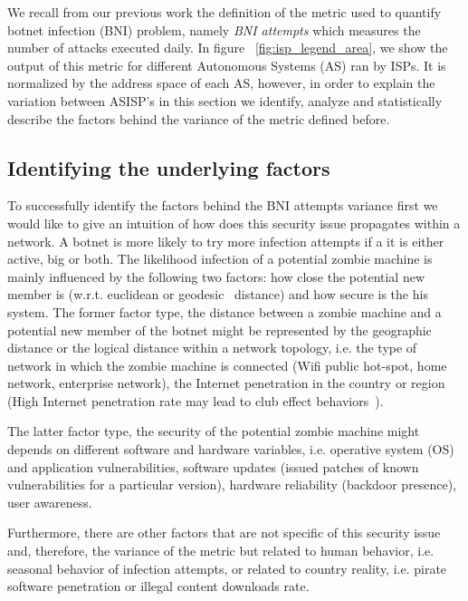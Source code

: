 


We recall from our previous work the definition of the metric used to quantify botnet infection (BNI) problem, namely \textit{BNI attempts} which measures the number of attacks executed daily. In figure ~\ref{fig:isp_legend_area}, we show the output of this metric for different Autonomous Systems (AS) ran by ISPs. It is normalized by the address space of each AS, however, in order to explain the variation between AS\/ISP's in this section we identify, analyze and statistically describe the factors behind the variance of the metric defined before.

\subsection{Identifying the underlying factors}
To successfully identify the factors behind the BNI attempts variance first we would like to give an intuition of how does this security issue propagates within a network. A botnet is more likely to try more infection attempts if a it is either active, big or both. The likelihood infection of a potential zombie machine is mainly influenced by the following two factors: how close the potential new member is (w.r.t. euclidean or geodesic~\cite{geodesic} distance) and how secure is the his system.
The former factor type, the distance between a zombie machine and a potential new member of the botnet might be represented by the geographic distance or the logical distance within a network topology, i.e. the type of network in which the zombie machine is connected (Wifi public hot-spot, home network, enterprise network), the Internet penetration in the country or region (High Internet penetration rate may lead to club effect behaviors~\cite{club_effects}).

The latter factor type, the security of the potential zombie machine might depends on different software and hardware variables, i.e. operative system (OS) and application vulnerabilities, software updates (issued patches of known vulnerabilities for a particular version), hardware reliability (backdoor presence), user awareness.

Furthermore, there are other factors that are not specific of this security issue and, therefore, the variance of the metric but related to human behavior, i.e. seasonal behavior of infection attempts, or related to country reality, i.e. pirate software penetration or illegal content downloads rate.


